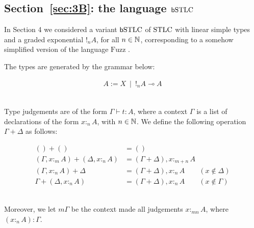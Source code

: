 
\subsection{Section~\ref{sec:3B}: the language $\mathsf b\mathrm{STLC}$}

In Section 4 we considered a variant $\mathsf b\mathrm{STLC}$ of $\mathrm{STLC}$ with linear simple types and a graded exponential $!_{n}A$, for all $n\in \mathbb{N}$, corresponding to a somehow simplified version of the language $\mathrm{Fuzz}$ \cite{Reed2010}. 
%


The types are generated by the grammar below:


{
\begin{minipage}{\textwidth}
\begin{align*}
A:= X \ \mid  \ !_{n}A \multimap A
\end{align*}\end{minipage}}\medskip\\
Type judgements are of the form $\Gamma \vdash t:A$, where a context $\Gamma$ is a list of declarations of the form $x :_{n}A$, with $n\in \mathbb{N}$.
We define the following operation $\Gamma+\Delta$  as follows:

{
\begin{minipage}{\textwidth}
\begin{align*}
() + () & =() \\
(\Gamma, x:_{m} A)+( \Delta, x:_{n} A) & =  (\Gamma+\Delta), x:_{m+n}A \\
(\Gamma, x:_{n}A)+\Delta & =(\Gamma+\Delta), x:_{n}A \qquad (x\notin \Delta) \\
\Gamma+ (\Delta, x:_{n}A) &= (\Gamma+\Delta), x:_{n} A \qquad (x\notin \Gamma)
\end{align*}\end{minipage}}\medskip\\
Moreover, we let $m\Gamma$ be the context made all judgements $x:_{mn}A$, where $(x:_{n}A): \Gamma$.  

